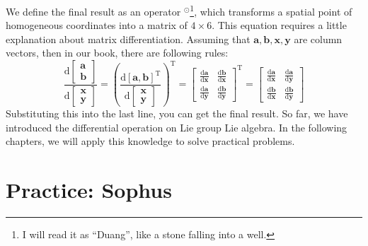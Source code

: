 We define the final result as an operator $^\odot$\footnote{I will read it as ``Duang'', like a stone falling into a well.}, which transforms a spatial point of homogeneous coordinates into a matrix of $4 \times 6$. This equation requires a little explanation about matrix differentiation. Assuming that $\mathbf{a}, \mathbf{b}, \mathbf{x}, \mathbf{y}$ are column vectors, then in our book, there are following rules:
\begin{equation}
\frac{\mathrm{\mathrm{d}}\begin{bmatrix}
    \mathbf{a}\\
    \mathbf{b}
    \end{bmatrix}}{{\mathrm{d} \begin{bmatrix}
        \mathbf{x}\\
        \mathbf{y}
        \end{bmatrix}}} = {\left( \frac{\mathrm{d}[\mathbf{a},\mathbf{b}]^\mathrm{T}}{{\mathrm{d}\begin{bmatrix}
            \mathbf{x}\\
            \mathbf{y}
            \end{bmatrix}}} \right)^\mathrm{T}} = {{\begin{bmatrix}
        {\frac{{\mathrm{d}\mathbf{a}}}{{\mathrm{d}\mathbf{x}}}}&{\frac{{\mathrm{d}\mathbf{b}}}{{\mathrm{d}\mathbf{x}}}}\\
        {\frac{{\mathrm{d}\mathbf{a}}}{{\mathrm{d}\mathbf{y}}}}&{\frac{{\mathrm{d}\mathbf{b}}}{{\mathrm{d}\mathbf{y}}}}
        \end{bmatrix}} ^\mathrm{T}} = {\begin{bmatrix}
    {\frac{{\mathrm{d}\mathbf{a}}}{{\mathrm{d}\mathbf{x}}}}&{\frac{{\mathrm{d}\mathbf{a}}}{{\mathrm{d}\mathbf{y}}}}\\
    {\frac{{\mathrm{d}\mathbf{b}}}{{\mathrm{d}\mathbf{x}}}}&{\frac{{\mathrm{d}\mathbf{b}}}{{\mathrm{d}\mathbf{y}}}}
    \end{bmatrix}}
\end{equation}
Substituting this into the last line, you can get the final result. So far, we have introduced the differential operation on Lie group Lie algebra. In the following chapters, we will apply this knowledge to solve practical problems. 

\section{Practice: Sophus}
